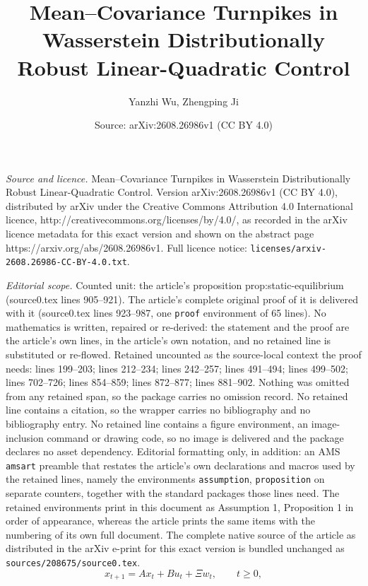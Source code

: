 \documentclass[10pt,a4paper]{amsart}
\title{Mean--Covariance Turnpikes in Wasserstein Distributionally Robust Linear-Quadratic Control}
\author{Yanzhi Wu, Zhengping Ji}
\date{Source: arXiv:2608.26986v1 (CC BY 4.0)}
\begin{document}
\maketitle

\noindent\emph{Source and licence.} Mean--Covariance Turnpikes in Wasserstein Distributionally Robust Linear-Quadratic Control. Version arXiv:2608.26986v1 (CC BY 4.0), distributed by arXiv under the Creative Commons Attribution 4.0 International licence, http://creativecommons.org/licenses/by/4.0/, as recorded in the arXiv licence metadata for this exact version and shown on the abstract page https://arxiv.org/abs/2608.26986v1. Full licence notice: \texttt{licenses/arxiv-2608.26986-CC-BY-4.0.txt}.\par\smallskip

\noindent\textit{Editorial scope.} Counted unit: the article's proposition prop:static-equilibrium (source0.tex lines 905--921). The article's complete original proof of it is delivered with it (source0.tex lines 923--987, one \texttt{proof} environment of 65 lines). No mathematics is written, repaired or re-derived: the statement and the proof are the article's own lines, in the article's own notation, and no retained line is substituted or re-flowed.  Retained uncounted as the source-local context the proof needs: lines 199--203; lines 212--234; lines 242--257; lines 491--494; lines 499--502; lines 702--726; lines 854--859; lines 872--877; lines 881--902.  Nothing was omitted from any retained span, so the package carries no omission record.  No retained line contains a citation, so the wrapper carries no bibliography and no bibliography entry.  No retained line contains a figure environment, an image-inclusion command or drawing code, so no image is delivered and the package declares no asset dependency.  Editorial formatting only, in addition: an AMS \texttt{amsart} preamble that restates the article's own declarations and macros used by the retained lines, namely the environments \texttt{assumption}, \texttt{proposition} on separate counters, together with the standard packages those lines need.  The retained environments print in this document as Assumption 1, Proposition 1 in order of appearance, whereas the article prints the same items with the numbering of its own full document.  The complete native source of the article as distributed in the arXiv e-print for this exact version is bundled unchanged as \texttt{sources/208675/source0.tex}.
\begin{equation}
	x_{t+1}=Ax_t+Bu_t+\Xi w_t,
	\qquad t\ge 0,
	\label{eq:sys}
\end{equation}
\end{document}
